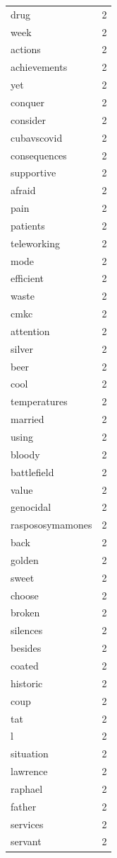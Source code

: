 \begin{tabular}{lr}
drug & 2 \\
week & 2 \\
actions & 2 \\
achievements & 2 \\
yet & 2 \\
conquer & 2 \\
consider & 2 \\
cubavscovid & 2 \\
consequences & 2 \\
supportive & 2 \\
afraid & 2 \\
pain & 2 \\
patients & 2 \\
teleworking & 2 \\
mode & 2 \\
efficient & 2 \\
waste & 2 \\
cmkc & 2 \\
attention & 2 \\
silver & 2 \\
beer & 2 \\
cool & 2 \\
temperatures & 2 \\
married & 2 \\
using & 2 \\
bloody & 2 \\
battlefield & 2 \\
value & 2 \\
genocidal & 2 \\
raspososymamones & 2 \\
back & 2 \\
golden & 2 \\
sweet & 2 \\
choose & 2 \\
broken & 2 \\
silences & 2 \\
besides & 2 \\
coated & 2 \\
historic & 2 \\
coup & 2 \\
tat & 2 \\
l & 2 \\
situation & 2 \\
lawrence & 2 \\
raphael & 2 \\
father & 2 \\
services & 2 \\
servant & 2 \\

\end{tabular}
